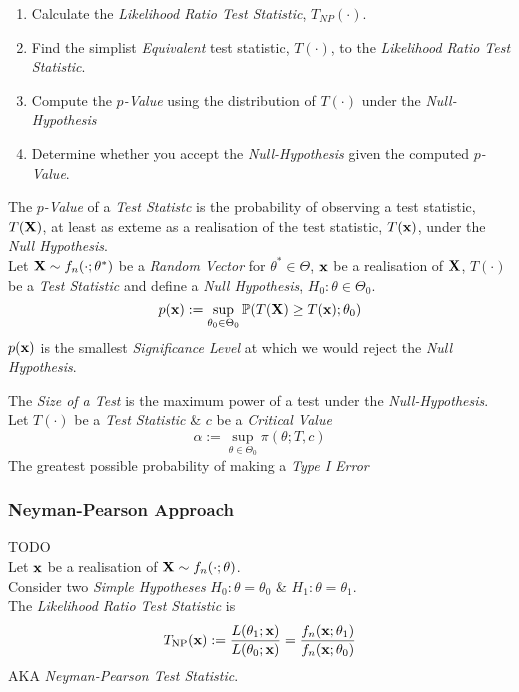 \documentclass[11pt,a4paper]{article}
\begin{document}

\begin{enumerate}
	\item Calculate the \textit{Likelihood Ratio Test Statistic}, $T_{NP}(\cdot)$.
	\item Find the simplist \textit{Equivalent} test statistic, $T(\cdot)$, to the \textit{Likelihood Ratio Test Statistic}.
	\item Compute the \textit{$p$-Value} using the distribution of $T(\cdot)$ under the \textit{Null-Hypothesis}
	\item Determine whether you accept the \textit{Null-Hypothesis} given the computed \textit{$p$-Value}.
\end{enumerate}

The \textit{$p$-Value} of a \textit{Test Statistc} is the probability of observing a test statistic, $T(\textbf{X})$, at least as exteme as a realisation of the test statistic, $T(\textbf{x})$, under the \textit{Null Hypothesis}.\\
Let $\textbf{X}\sim f_n(\cdot;\theta^*)$ be a \textit{Random Vector} for $\theta^*\in\Theta$, $\textbf{x}$ be a realisation of $\textbf{X}$, $T(\cdot)$ be a \textit{Test Statistic} and define a \textit{Null Hypothesis}, $H_0:\theta\in\Theta_0$.
$$p(\textbf{x}):=\sup_{\theta_0\in\Theta_0}\mathbb{P}(T(\textbf{X})\geq T(\textbf{x});\theta_0)$$
\nb $p(\textbf{x})$ is the smallest \textit{Significance Level} at which we would reject the \textit{Null Hypothesis}.\\


The \textit{Size of a Test} is the maximum power of a test under the \textit{Null-Hypothesis}.\\
Let $T(\cdot)$ be a \textit{Test Statistic} \& $c$ be a \textit{Critical Value}
$$\alpha:=\sup_{\theta\in\Theta_0}\pi(\theta;T,c)$$
\ie The greatest possible probability of making a \textit{Type I Error}

\subsubsection{Neyman-Pearson Approach}

TODO\\

Let $\textbf{x}$ be a realisation of $\textbf{X}\sim f_n(\cdot;\theta)$.\\
Consider two \textit{Simple Hypotheses} $H_0:\theta=\theta_0$ \& $H_1:\theta=\theta_1$.\\
The \textit{Likelihood Ratio Test Statistic} is
$$T_\text{NP}(\textbf{x}):=\frac{L(\theta_1;\textbf{x})}{L(\theta_0;\textbf{x})}=\frac{f_n(\textbf{x};\theta_1)}{f_n(\textbf{x};\theta_0)}$$
\nb AKA \textit{Neyman-Pearson Test Statistic}.\\
\end{document}
